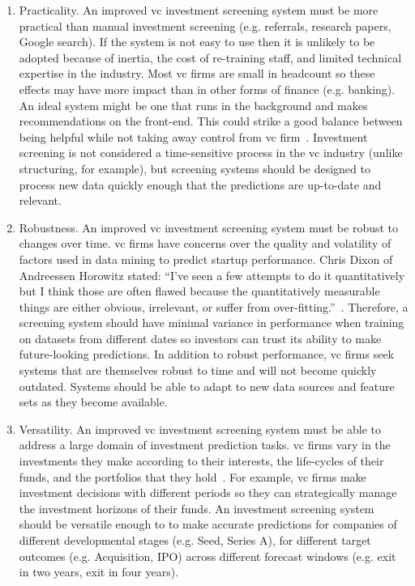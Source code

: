 \documentclass[../thesis/thesis.tex]{subfiles}
\begin{document}
\begin{enumerate}

\item Practicality. An improved \gls{vc} investment screening system must be more practical than manual investment screening (e.g. referrals, research papers, Google search). If the system is not easy to use then it is unlikely to be adopted because of inertia, the cost of re-training staff, and limited technical expertise in the industry. Most \gls{vc} firms are small in headcount so these effects may have more impact than in other forms of finance (e.g. banking). An ideal system might be one that runs in the background and makes recommendations on the front-end. This could strike a good balance between being helpful while not taking away control from \gls{vc} firm~\cite{fried2006}. Investment screening is not considered a time-sensitive process in the \gls{vc} industry (unlike structuring, for example), but screening systems should be designed to process new data quickly enough that the predictions are up-to-date and relevant.

\item Robustness. An improved \gls{vc} investment screening system must be robust to changes over time. \Gls{vc} firms have concerns over the quality and volatility of factors used in data mining to predict startup performance. Chris Dixon of Andreessen Horowitz stated: ``I've seen a few attempts to do it quantitatively but I think those are often flawed because the quantitatively measurable things are either obvious, irrelevant, or suffer from over-fitting.''~\cite{stone2014}. Therefore, a screening system should have minimal variance in performance when training on datasets from different dates so investors can trust its ability to make future-looking predictions. In addition to robust performance, \gls{vc} firms seek systems that are themselves robust to time and will not become quickly outdated. Systems should be able to adapt to new data sources and feature sets as they become available.

\item Versatility. An improved \gls{vc} investment screening system must be able to address a large domain of investment prediction tasks. \Gls{vc} firms vary in the investments they make according to their interests, the life-cycles of their funds, and the portfolios that they hold~\cite{gompers1995}. For example, \gls{vc} firms make investment decisions with different periods so they can strategically manage the investment horizons of their funds. An investment screening system should be versatile enough to to make accurate predictions for companies of different developmental stages (e.g. Seed, Series A), for different target outcomes (e.g. Acquisition, IPO) across different forecast windows (e.g. exit in two years, exit in four years).

\end{enumerate}
\end{document}
